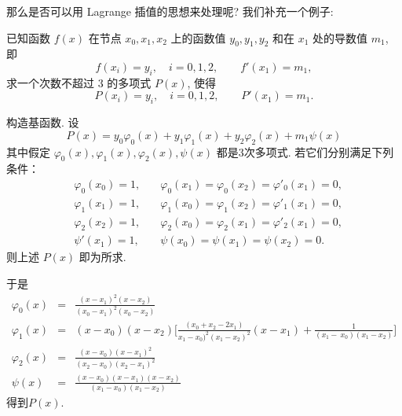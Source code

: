 \documentclass[a4paper]{ctexart}
\numberwithin{theorem}{section}
\numberwithin{equation}{section}
\numberwithin{figure}{section}
\numberwithin{remark}{section}
\begin{document}
那么是否可以用 Lagrange 插值的思想来处理呢? 我们补充一个例子:

已知函数 $f(x)$ 在节点 $x_0, x_1, x_2$ 上的函数值 $y_0, y_1, y_2$ 和在 $x_1$ 处的导数值
$m_1$, 即                                                                           
$$
f(x_i) = y_i,\quad i = 0, 1, 2, \qquad f'(x_1) = m_1,
$$                                 
求一个次数不超过 $3$ 的多项式 $P(x)$, 使得                                            
$$
P(x_i) = y_i,\quad i = 0, 1, 2, \qquad P'(x_1) = m_1.
$$  

构造基函数. 设                                                                   
$$
P(x) = y_0 \varphi_0(x) + y_1 \varphi_1(x) + y_2 \varphi_2(x) + m_1 \psi(x)
$$                                 
其中假定 $\varphi_0(x), \varphi_1(x), \varphi_2(x), \psi(x)$ 都是3次多项式.
若它们分别满足下列条件：     
\begin{eqnarray*}                                                                                    
&\varphi_0(x_0)=1, \quad &\varphi_0(x_1)=\varphi_0(x_2)=\varphi'_0(x_1)=0,\\             
&\varphi_1(x_1)=1,\quad &\varphi_1(x_0)=\varphi_1(x_2)=\varphi'_1(x_1)=0,\\             
&\varphi_2(x_2)=1,\quad &\varphi_2(x_0)=\varphi_2(x_1)=\varphi'_2(x_1)=0,\\             
&\psi'(x_1)=1,\quad &\psi(x_0)=\psi(x_1)=\psi(x_2)=0.                                   
\end{eqnarray*}                                                                                      
则上述 $P(x)$ 即为所求.

于是                                                                                     
\begin{eqnarray*}                                                                                            
\varphi_0(x)&=&\frac{(x-x_1)^2(x-x_2)}{(x_0-x_1)^2(x_0-x_2)}\\                                       
\varphi_1(x)&=&(x-x_0)(x-x_2)\Big[\frac{(x_0+x_2-2x_1)}{x_1-x_0)^2(x_1-x_2)^2}(x-x_1)+\frac{1}{(x_1-\
x_0)(x_1-x_2)}\Big]\\                                                                               
\varphi_2(x)&=&\frac{(x-x_0)(x-x_1)^2}{(x_2-x_0)(x_2-x_1)^2}\\                                       
\psi(x)&=&\frac{(x-x_0)(x-x_1)(x-x_2)}{(x_1-x_0)(x_1-x_2)}                                           
\end{eqnarray*}                                                                                                  
得到$P(x)$.
\end{document}
